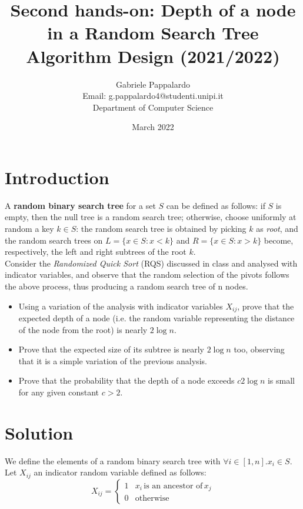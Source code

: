 \documentclass{article}
\title{Second hands-on: Depth of a node in a Random Search Tree\\[1ex] \large Algorithm Design (2021/2022)}
\author{Gabriele Pappalardo\\Email: g.pappalardo4@studenti.unipi.it\\Department of Computer Science}
\date{March 2022}
\begin{document}
\maketitle

\section{Introduction}

A \textbf{random binary search tree} for a set $S$ can be defined as follows: if $S$ is empty, then the null tree is a random search tree; otherwise, choose uniformly at random a key $k \in S$: the random search tree is obtained by picking $k$ as \textit{root}, and the random search trees on $L = \{x \in S : x < k\}$ and $R = \{x \in S : x > k\}$ become, respectively, the left and right subtrees of the root $k$.\\

\noindent Consider the \textit{Randomized Quick Sort} (RQS) discussed in class and analysed with indicator variables, and observe that the random selection of the pivots follows the above process, thus producing a random search tree of n nodes.\\

\begin{itemize}
    \item Using a variation of the analysis with indicator variables $X_{ij}$, prove that the expected depth of a node (i.e. the random variable representing the distance of the node from the root) is nearly $2 \log n$. 
    \item Prove that the expected size of its subtree is nearly $2 \log n$ too, observing that it is a simple variation of the previous analysis.
    \item Prove that the probability that the depth of a node exceeds $c2 \log n$ is small for any given constant $c > 2$. 
\end{itemize}


\section{Solution}

We define the elements of a random binary search tree with $\forall i \in [1, n] . x_i \in S$. Let $X_{ij}$ an indicator random variable defined as follows:
\begin{equation}
    X_{ij} = \begin{cases}
    1 & x_i \, \textrm{is an ancestor of} \, x_j\\
    0 & \textrm{otherwise}
    \end{cases}
\end{equation}
\end{document}
